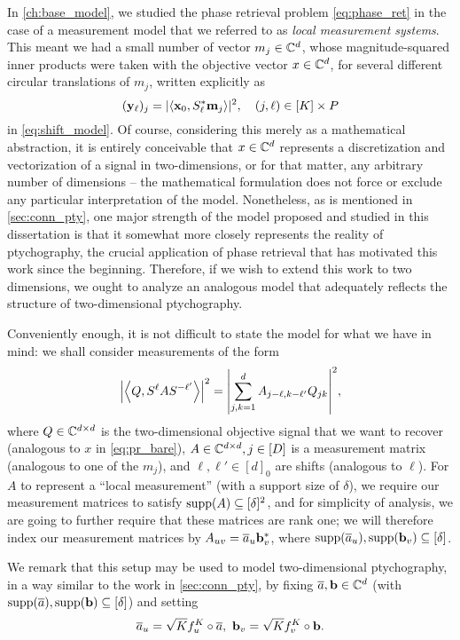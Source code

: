 In \cref{ch:base_model}, we studied the phase retrieval problem \eqref{eq:phase_ret} in the case of a measurement model that we referred to as \emph{local measurement systems}.  This meant we had a small number of vector $m_j \in \mathbb{C}^d$, whose magnitude-squared inner products were taken with the objective vector $x \in \mathbb{C}^d$, for several different circular translations of $m_j$, written explicitly as \[ (\mathbf{y}_\ell)_j = |\langle \mathbf{x}_0, S^*_\ell \mathbf{m}_j \rangle|^2, \quad (j, \ell) \in [K] \times P\] in \eqref{eq:shift_model}.  Of course, considering this merely as a mathematical abstraction, it is entirely conceivable that $x \in \mathbb{C}^d$ represents a discretization and vectorization of a signal in two-dimensions, or for that matter, any arbitrary number of dimensions -- the mathematical formulation does not force or exclude any particular interpretation of the model.  Nonetheless, as is mentioned in \cref{sec:conn_pty}, one major strength of the model proposed and studied in this dissertation is that it somewhat more closely represents the reality of ptychography, the crucial application of phase retrieval that has motivated this work since the beginning.  Therefore, if we wish to extend this work to two dimensions, we ought to analyze an analogous model that adequately reflects the structure of two-dimensional ptychography.

Conveniently enough, it is not difficult to state the model for what we have in mind: we shall consider measurements of the form \begin{equation} \abs*{\inner*{Q, S^{\ell} A S^{-\ell'}}}^2 = \abs*{\sum_{j, k = 1}^d A_{j - \ell, k - \ell'} Q_{jk}}^2, \label{eq:2d_meas} \end{equation} where $Q \in \mathbb{C}^{d \times d}$ is the two-dimensional objective signal that we want to recover (analogous to $x$ in \eqref{eq:pr_bare}), $A \in \mathbb{C}^{d \times d}, j \in [D]$ is a measurement matrix (analogous to one of the $m_j$), and $\ell, \ell' \in [d]_0$ are shifts (analogous to $\ell$).  For $A$ to represent a ``local measurement'' (with a support size of $\delta$), we require our measurement matrices to satisfy $\operatorname{supp}(A) \subseteq [\delta]^2$, and for simplicity of analysis, we are going to further require that these matrices are rank one; we will therefore index our measurement matrices by $A_{uv} = \overline{a}_u \mathbf b_v^*$, where $\operatorname{supp}(\overline{a}_u), \operatorname{supp}(\mathbf b_v) \subseteq [\delta]$.

We remark that this setup may be used to model two-dimensional ptychography, in a way similar to the work in \cref{sec:conn_pty}, by fixing $\overline{a}, \mathbf b \in \mathbb{C}^d$ (with $\operatorname{supp}(\overline{a}), \operatorname{supp}(\mathbf b) \subseteq [\delta]$) and setting \[\a_u = \sqrt{K} f_u^K \circ \a, \ \b_v = \sqrt{K} f_v^K \circ \b.\]
  
